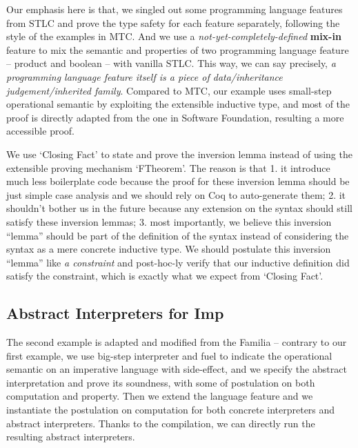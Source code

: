 Our emphasis here is that, we singled out some programming language features from STLC and prove the type safety for each feature separately, following the style of the examples in MTC\citep{delaware2013,forsta2020}. And we use a \textit{not-yet-completely-defined} \textbf{mix-in} feature to mix the semantic and properties of two programming language feature -- product and boolean -- with vanilla STLC. This way, we can say precisely, \textit{a programming language feature itself is a piece of data/inheritance judgement/inherited family}. Compared to MTC, our example uses small-step operational semantic by exploiting the extensible inductive type, and most of the proof is directly adapted from the one in Software Foundation, resulting a more accessible proof. 

We use `Closing Fact' to state and prove the inversion lemma instead of using the extensible proving mechanism `FTheorem'. The reason is that 1. it introduce much less boilerplate code because the proof for these inversion lemma should be just simple case analysis and we should rely on Coq to auto-generate them; 2. it shouldn't bother us in the future because any extension on the syntax should still satisfy these inversion lemmas; 3. most importantly, we believe this inversion ``lemma'' should be part of the definition of the syntax instead of considering the syntax as a mere concrete inductive type. We should postulate this inversion ``lemma'' like \textit{a constraint} and post-hoc-ly verify that our inductive definition did satisfy the constraint, which is exactly what we expect from `Closing Fact'.

\subsection{Abstract Interpreters for Imp}
The second example is adapted and modified from the Familia\citep{zhang2017familia}
-- contrary to our first example, we use big-step interpreter and fuel to indicate the operational semantic on an imperative language with side-effect, and we specify the abstract interpretation and prove its soundness, with some of postulation on both computation and property. Then we extend the language feature and we instantiate the postulation on computation for both concrete interpreters and abstract interpreters. Thanks to the compilation, we can directly run the resulting abstract interpreters.